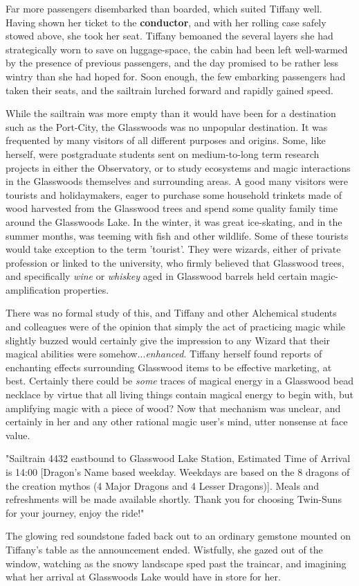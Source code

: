 Far more passengers disembarked than boarded, which suited Tiffany well.
Having shown her ticket to the \textbf{conductor}, and with her rolling case safely stowed above, she took her seat.
Tiffany bemoaned the several layers she had strategically worn to save on luggage-space, the cabin had been left well-warmed by the presence of previous passengers, and the day promised to be rather less wintry than she had hoped for.
Soon enough, the few embarking passengers had taken their seats, and the sailtrain lurched forward and rapidly gained speed.

While the sailtrain was more empty than it would have been for a destination such as the Port-City, the Glasswoods was no unpopular destination.
It was frequented by many visitors of all different purposes and origins.
Some, like herself, were postgraduate students sent on medium-to-long term research projects in either the Observatory, or to study ecosystems and magic interactions in the Glasswoods themselves and surrounding areas.
A good many visitors were tourists and holidaymakers, eager to purchase some household trinkets made of wood harvested from the Glasswood trees and spend some quality family time around the Glasswoods Lake.
In the winter, it was great ice-skating, and in the summer months, was teeming with fish and other wildlife.
Some of these tourists would take exception to the term 'tourist'. 
They were wizards, either of private profession or linked to the university, who firmly believed that Glasswood trees, and specifically \textit{wine} or \textit{whiskey} aged in Glasswood barrels held certain magic-amplification properties.

There was no formal study of this, and Tiffany and other Alchemical students and colleagues were of the opinion that simply the act of practicing magic while slightly buzzed would certainly give the impression to any Wizard that their magical abilities were somehow...\textit{enhanced}.
Tiffany herself found reports of enchanting effects surrounding Glasswood items to be effective marketing, at best.
Certainly there could be \textit{some} traces of magical energy in a Glasswood bead necklace by virtue that all living things contain magical energy to begin with, but amplifying magic with a piece of wood? 
Now that mechanism was unclear, and certainly in her and any other rational magic user's mind, utter nonsense at face value. 

"Sailtrain 4432 eastbound to Glasswood Lake Station, Estimated Time of Arrival is 14:00 [Dragon's Name based weekday. Weekdays are based on the 8 dragons of the creation mythos (4 Major Dragons and 4 Lesser Dragons)]. Meals and refreshments will be made available shortly. Thank you for choosing Twin-Suns for your journey, enjoy the ride!"

The glowing red soundstone faded back out to an ordinary gemstone mounted on Tiffany's table as the announcement ended.
Wistfully, she gazed out of the window, watching as the snowy landscape sped past the traincar, and imagining what her arrival at Glasswoods Lake would have in store for her.
